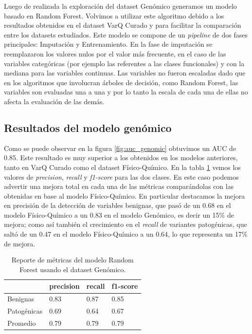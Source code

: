 Luego de realizada la exploración del dataset Genómico generamos un modelo basado en Random Forest. Volvimos a utilizar este algoritmo debido a los resultados obtenidos en el dataset VarQ Curado y para facilitar la comparación entre los datasets estudiados. Este modelo se compone de un \textit{pipeline} de dos fases principales: Imputación y Entrenamiento. En la fase de imputación se reemplazaron los valores nulos por el valor más frecuente, en el caso de las variables categóricas (por ejemplo las referentes a las clases funcionales) y con la mediana para las variables continuas. Las variables no fueron escaladas dado que en los algoritmos que involucran árboles de decisión, como Random Forest, las variables son evaluadas una a una y por lo tanto la escala de cada una de ellas no afecta la evaluación de las demás.

\subsection{Resultados del modelo genómico}

Como se puede observar en la figura \ref{fig:auc_genomic} obtuvimos un AUC de 0.85. Este resultado es muy superior a los obtenidos en los modelos anteriores, tanto en VarQ Curado como el dataset Físico-Químico. En la tabla \ref{tab:metrics_genomic} vemos los valores de \textit{precision}, \textit{recall} y \textit{f1-score} para las dos clases. En este caso podemos advertir una mejora total en cada una de las métricas comparándolas con las obtenidas en base al modelo Físico-Químico. En particular destacamos la mejora en precisión de la detección de variables benignas, que pasó de un 0.68 en el modelo Físico-Químico a un 0.83 en el modelo Genómico, es decir un 15\% de mejora; como así también el crecimiento en el \textit{recall} de variantes patogénicas, que saltó de un 0.47 en el modelo Físico-Químico a un 0.64, lo que representa un 17\% de mejora.

\begin{table}[H]
\centering
\begin{tabular}{|l|l|l|l|}
\hline
             & precision & recall & f1-score \\ \hline
Benignas     & 0.83      & 0.87   & 0.85     \\ \hline
Patogénicas  & 0.69      & 0.64   & 0.67     \\ \hline
Promedio     & 0.79      & 0.79   & 0.79     \\ \hline
\end{tabular}
\caption{Reporte de métricas del modelo Random Forest usando el dataset Genómico.}
\label{tab:metrics_genomic}
\end{table}

